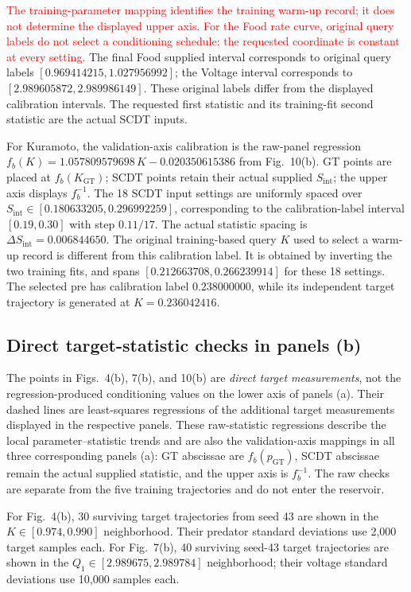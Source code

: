\documentclass[10pt,a4paper]{article}
\begin{document}
\textcolor{red}{The training-parameter mapping identifies the training warm-up
record; it does not determine the displayed upper axis. For the Food rate
curve, original query labels do not select a conditioning schedule: the
requested coordinate is constant at every setting.} The final Food supplied interval corresponds to
original query labels $[0.969414215,1.027956992]$; the Voltage interval
corresponds to $[2.989605872,2.989986149]$. These original labels differ
from the displayed calibration intervals. The requested first statistic
and its training-fit second statistic are the actual SCDT inputs.

For Kuramoto, the validation-axis calibration is the raw-panel regression
$f_b(K)=1.057809579698\,K-0.020350615386$ from Fig.~10(b).
GT points are placed at $f_b(K_{\mathrm{GT}})$; SCDT points retain their
actual supplied $S_{\mathrm{int}}$; the upper axis displays $f_b^{-1}$.
The 18 SCDT input settings are uniformly spaced over
$S_{\mathrm{int}}\in[0.180633205,0.296992259]$, corresponding to the
calibration-label interval $[0.19,0.30]$ with step $0.11/17$.
The actual statistic spacing is $\Delta S_{\mathrm{int}}=0.006844650$.
The original
training-based query $K$ used to select a warm-up record is different from
this calibration label. It is obtained by inverting the two training fits,
and spans $[0.212663708,0.266239914]$ for these 18 settings.
The selected pre has calibration label $0.238000000$, while its independent
target trajectory is generated at $K=0.236042416$.

\subsection{Direct target-statistic checks in panels (b)}

The points in Figs.~4(b), 7(b), and 10(b) are \emph{direct target
measurements}, not the regression-produced conditioning values on the lower
axis of panels (a). Their dashed lines are least-squares regressions of the
additional target measurements displayed in the respective panels. These
raw-statistic regressions describe the local parameter--statistic trends
and are also the validation-axis mappings in all three corresponding
panels (a): GT abscissae are $f_b(p_{\mathrm{GT}})$, SCDT abscissae remain
the actual supplied statistic, and the upper axis is $f_b^{-1}$.
The raw checks are separate from the five training
trajectories and do not enter the reservoir.

For Fig.~4(b), 30 surviving target trajectories from seed 43 are shown in the
$K\in[0.974,0.990]$ neighborhood. Their predator standard
deviations use 2,000 target samples each. For Fig.~7(b), 40 surviving seed-43
target trajectories are shown in the $Q_1\in[2.989675,2.989784]$ neighborhood;
their voltage standard deviations use 10,000 samples each.
\end{document}
